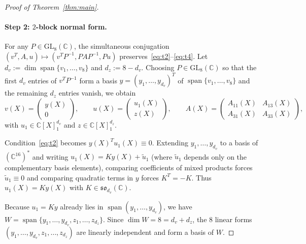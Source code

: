 \documentclass[11pt,a4paper]{article}
\theoremstyle{definition}
\DeclareMathOperator{\Span}{span}
\begin{document}
\begin{proof}[Proof of Theorem~\ref{thm:main}]
\paragraph{Step 2: $2$-block normal form.}
For any $P \in \mathrm{GL}_8(\mathbb{C})$, the simultaneous conjugation $(v^T, A, u) \mapsto (v^T P^{-1}, P A P^{-1}, P u)$ preserves~\eqref{eq:t2}--\eqref{eq:t4}. Let $d_v := \dim \Span\{v_1,\dots,v_8\}$ and $d_z := 8 - d_v$. Choosing $P \in \mathrm{GL}_8(\mathbb{C})$ so that the first $d_v$ entries of $v^T P^{-1}$ form a basis $y = (y_1,\dots,y_{d_v})^T$ of $\Span\{v_1,\dots,v_8\}$ and the remaining $d_z$ entries vanish, we obtain
\[
  v(X) = \begin{pmatrix} y(X) \\ 0 \end{pmatrix}, \qquad
  u(X) = \begin{pmatrix} u_1(X) \\ z(X) \end{pmatrix}, \qquad
  A(X) = \begin{pmatrix} A_{11}(X) & A_{13}(X) \\ A_{31}(X) & A_{33}(X) \end{pmatrix},
\]
with $u_1 \in \mathbb{C}[X]_1^{d_v}$ and $z \in \mathbb{C}[X]_1^{d_z}$.

Condition~\eqref{eq:t2} becomes $y(X)^T u_1(X) \equiv 0$. Extending $y_1,\dots,y_{d_v}$ to a basis of $(\mathbb{C}^{16})^*$ and writing $u_1(X) = K y(X) + \tilde{u}_1$ (where $\tilde{u}_1$ depends only on the complementary basis elements), comparing coefficients of mixed products forces $\tilde{u}_1 \equiv 0$ and comparing quadratic terms in $y$ forces $K^T = -K$. Thus $u_1(X) = K y(X)$ with $K \in \mathfrak{so}_{d_v}(\mathbb{C})$.

Because $u_1 = K y$ already lies in $\Span(y_1,\dots,y_{d_v})$, we have $W = \Span\{y_1,\dots,y_{d_v}, z_1,\dots,z_{d_z}\}$. Since $\dim W = 8 = d_v + d_z$, the $8$ linear forms $(y_1,\dots,y_{d_v}, z_1,\dots,z_{d_z})$ are linearly independent and form a basis of $W$.


\end{proof}
\end{document}
